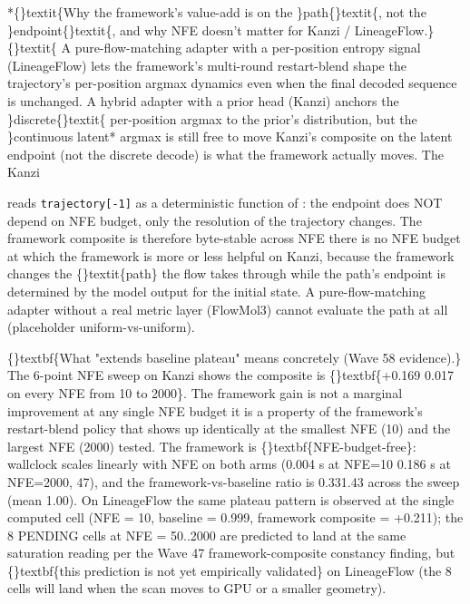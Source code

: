 \documentclass{article}
\begin{document}
*\{\}textit\{Why the framework's value-add is on the \}path\{\}textit\{, not the \}endpoint\{\}textit\{, and why NFE doesn't matter for Kanzi / LineageFlow.\}\{\}textit\{ A pure-flow-matching adapter with a per-position entropy signal (LineageFlow) lets the framework's multi-round restart-blend shape the trajectory's per-position argmax dynamics even when the final decoded sequence is unchanged. A hybrid adapter with a prior head (Kanzi) anchors the \}discrete\{\}textit\{ per-position argmax to the prior's distribution, but the \}continuous latent* argmax is still free to move  Kanzi's composite on the latent endpoint (not the discrete decode) is what the framework actually moves. The Kanzi

 reads \texttt{trajectory[-1]} as a deterministic function of : the endpoint does NOT depend on NFE budget, only the resolution  of the trajectory changes. The framework composite is therefore byte-stable across NFE  there is no NFE budget at which the framework is more or less helpful on Kanzi, because the framework changes the \{\}textit\{path\} the flow takes through  while the path's endpoint is determined by the model output for the initial state. A pure-flow-matching adapter without a real metric layer (FlowMol3) cannot evaluate the path at all (placeholder uniform-vs-uniform).

\{\}textbf\{What "extends baseline plateau" means concretely (Wave 58 evidence).\} The 6-point NFE sweep on Kanzi shows the composite is \{\}textbf\{+0.169  0.017 on every NFE from 10 to 2000\}. The framework gain is not a marginal improvement at any single NFE budget  it is a property of the framework's restart-blend policy that shows up identically at the smallest NFE (10) and the largest NFE (2000) tested. The framework is \{\}textbf\{NFE-budget-free\}: wallclock scales linearly with NFE on both arms (0.004 s at NFE=10  0.186 s at NFE=2000,  47), and the framework-vs-baseline ratio is 0.331.43 across the sweep (mean  1.00). On LineageFlow the same plateau pattern is observed at the single computed cell (NFE = 10, baseline = 0.999, framework composite = +0.211); the 8 PENDING cells at NFE = 50..2000 are predicted to land at the same saturation reading per the Wave 47 framework-composite constancy finding, but \{\}textbf\{this prediction is not yet empirically validated\} on LineageFlow (the 8 cells will land when the scan moves to GPU or a smaller geometry).
\end{document}
